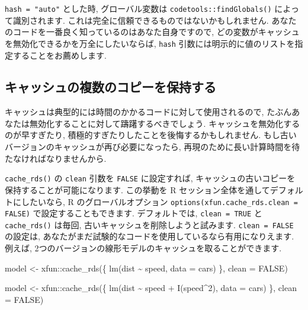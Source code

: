 \documentclass[
  11pt,
]{bxjsreport}
\newenvironment{Shaded}{\begin{snugshade}}{\end{snugshade}}
\newcommand{\AttributeTok}[1]{\textcolor[rgb]{0.77,0.63,0.00}{#1}}
\newcommand{\ConstantTok}[1]{\textcolor[rgb]{0.00,0.00,0.00}{#1}}
\newcommand{\DecValTok}[1]{\textcolor[rgb]{0.00,0.00,0.81}{#1}}
\newcommand{\FunctionTok}[1]{\textcolor[rgb]{0.00,0.00,0.00}{#1}}
\newcommand{\NormalTok}[1]{#1}
\newcommand{\OtherTok}[1]{\textcolor[rgb]{0.56,0.35,0.01}{#1}}
\newcommand{\SpecialCharTok}[1]{\textcolor[rgb]{0.00,0.00,0.00}{#1}}
\begin{document}
\texttt{hash = "auto"} とした時, グローバル変数は \texttt{codetools::findGlobals()} によって識別されます. これは完全に信頼できるものではないかもしれません. あなたのコードを一番良く知っているのはあなた自身ですので, どの変数がキャッシュを無効化できるかを万全にしたいならば, \texttt{hash} 引数には明示的に値のリストを指定することをお薦めします.

\hypertarget{ux30adux30e3ux30c3ux30b7ux30e5ux306eux8907ux6570ux306eux30b3ux30d4ux30fcux3092ux4fddux6301ux3059ux308b}{%
\subsection{キャッシュの複数のコピーを保持する}\label{ux30adux30e3ux30c3ux30b7ux30e5ux306eux8907ux6570ux306eux30b3ux30d4ux30fcux3092ux4fddux6301ux3059ux308b}}

キャッシュは典型的には時間のかかるコードに対して使用されるので, たぶんあなたは無効化することに対して躊躇するべきでしょう. キャッシュを無効化するのが早すぎたり, 積極的すぎたりしたことを後悔するかもしれません. もし古いバージョンのキャッシュが再び必要になったら, 再現のために長い計算時間を待たなければなりませんから.

\texttt{cache\_rds()} の \texttt{clean} 引数を \texttt{FALSE} に設定すれば, キャッシュの古いコピーを保持することが可能になります. この挙動を R セッション全体を通してデフォルトにしたいなら, R のグローバルオプション \texttt{options(xfun.cache\_rds.clean = FALSE)} で設定することもできます. デフォルトでは, \texttt{clean = TRUE} と \texttt{cache\_rds()} は毎回, 古いキャッシュを削除しようと試みます. \texttt{clean = FALSE} の設定は, あなたがまだ試験的なコードを使用しているなら有用になりえます. 例えば, 2つのバージョンの線形モデルのキャッシュを取ることができます.

\begin{Shaded}
\begin{Highlighting}[numbers=left,,]
\NormalTok{model }\OtherTok{\textless{}{-}}\NormalTok{ xfun}\SpecialCharTok{::}\FunctionTok{cache\_rds}\NormalTok{(\{}
  \FunctionTok{lm}\NormalTok{(dist }\SpecialCharTok{\textasciitilde{}}\NormalTok{ speed, }\AttributeTok{data =}\NormalTok{ cars)}
\NormalTok{\}, }\AttributeTok{clean =} \ConstantTok{FALSE}\NormalTok{)}

\NormalTok{model }\OtherTok{\textless{}{-}}\NormalTok{ xfun}\SpecialCharTok{::}\FunctionTok{cache\_rds}\NormalTok{(\{}
  \FunctionTok{lm}\NormalTok{(dist }\SpecialCharTok{\textasciitilde{}}\NormalTok{ speed }\SpecialCharTok{+} \FunctionTok{I}\NormalTok{(speed}\SpecialCharTok{\^{}}\DecValTok{2}\NormalTok{), }\AttributeTok{data =}\NormalTok{ cars)}
\NormalTok{\}, }\AttributeTok{clean =} \ConstantTok{FALSE}\NormalTok{)}
\end{Highlighting}
\end{Shaded}
\end{document}
